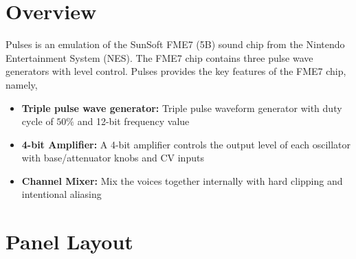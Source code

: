 \documentclass[12pt,letter]{article}
\begin{document}


\section{Overview}

Pulses is an emulation of the SunSoft FME7 (5B) sound chip from the Nintendo Entertainment System (NES). The FME7 chip contains three pulse wave generators with level control. Pulses provides the key features of the FME7 chip, namely,
\begin{itemize}
  \item \textbf{Triple pulse wave generator:} Triple pulse waveform generator with duty cycle of $50\%$ and 12-bit frequency value
  \item \textbf{4-bit Amplifier:} A 4-bit amplifier controls the output level of each oscillator with base/attenuator knobs and CV inputs
  \item \textbf{Channel Mixer:} Mix the voices together internally with hard clipping and intentional aliasing
\end{itemize}


\clearpage
\section{Panel Layout}
\end{document}

